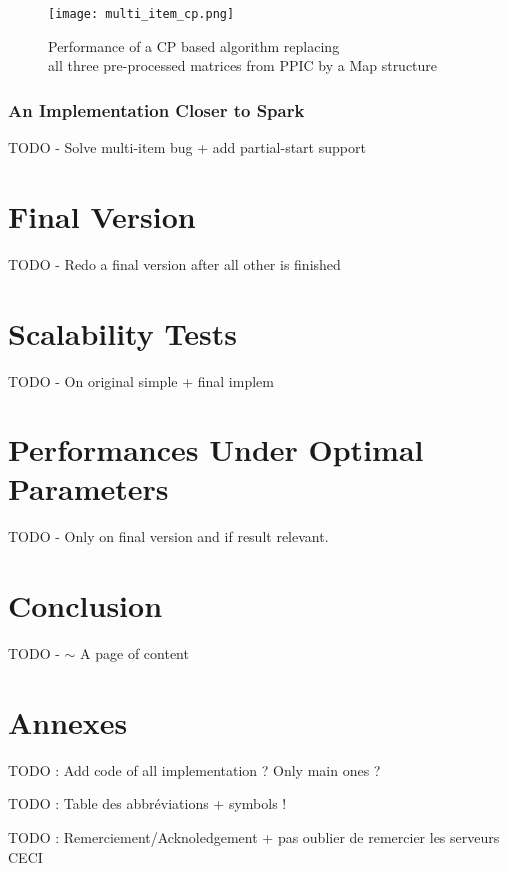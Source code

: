 \documentclass{eplmastersthesis}
\begin{document}
\begin{figure}[h]
  \centering
  \texttt{[image: multi\_item\_cp.png]}
  \caption[PPIC with a map structure]{
  		Performance of a CP based algorithm replacing \\
  		all three pre-processed matrices from PPIC by a Map structure
  	\endtabular
  }
  \label{fig:multi_map}
\end{figure}

\subsubsection{An Implementation Closer to Spark}

TODO - Solve multi-item bug + add partial-start support

\section{Final Version}

TODO - Redo a final version after all other is finished

\section{Scalability Tests}

TODO - On original simple + final implem

\section{Performances Under Optimal Parameters}

TODO - Only on final version and if result relevant.

\section{Conclusion}

TODO - $\sim$ A page of content

\section{Annexes}

TODO : Add code of all implementation ? Only main ones ?

TODO : Table des abbréviations + symbols !

TODO : Remerciement/Acknoledgement + pas oublier de remercier les serveurs CECI
\end{document}
